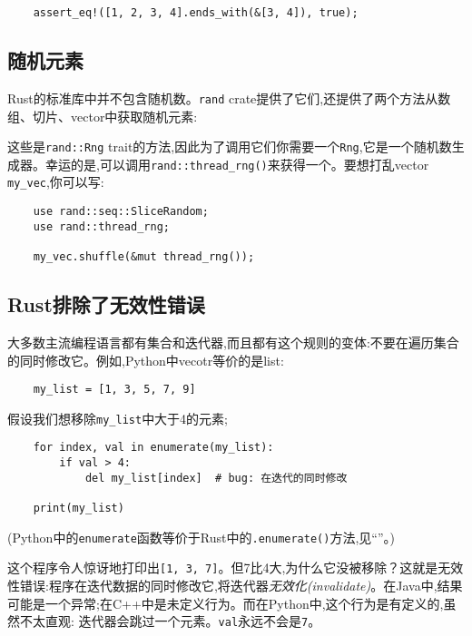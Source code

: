 \begin{verbatim}
    assert_eq!([1, 2, 3, 4].ends_with(&[3, 4]), true);
\end{verbatim}

\subsection{随机元素}
Rust的标准库中并不包含随机数。\texttt{rand} crate提供了它们,还提供了两个方法从数组、切片、vector中获取随机元素:



这些是\texttt{rand::Rng} trait的方法,因此为了调用它们你需要一个\texttt{Rng},它是一个随机数生成器。幸运的是,可以调用\texttt{rand::thread\_rng()}来获得一个。要想打乱vector \texttt{my\_vec},你可以写:
\begin{verbatim}
    use rand::seq::SliceRandom;
    use rand::thread_rng;

    my_vec.shuffle(&mut thread_rng());
\end{verbatim}

\subsection{Rust排除了无效性错误}
大多数主流编程语言都有集合和迭代器,而且都有这个规则的变体:不要在遍历集合的同时修改它。例如,Python中vecotr等价的是list:
\begin{verbatim}
    my_list = [1, 3, 5, 7, 9]
\end{verbatim}

假设我们想移除\texttt{my\_list}中大于4的元素;
\begin{verbatim}
    for index, val in enumerate(my_list):
        if val > 4:
            del my_list[index]  # bug: 在迭代的同时修改
    
    print(my_list)
\end{verbatim}
(Python中的\texttt{enumerate}函数等价于Rust中的\texttt{.enumerate()}方法,见“”。)

这个程序令人惊讶地打印出\texttt{[1, 3, 7]}。但7比4大,为什么它没被移除？这就是无效性错误:程序在迭代数据的同时修改它,将迭代器\emph{无效化(invalidate)}。在Java中,结果可能是一个异常;在C++中是未定义行为。而在Python中,这个行为是有定义的,虽然不太直观:
迭代器会跳过一个元素。\texttt{val}永远不会是\texttt{7}。


